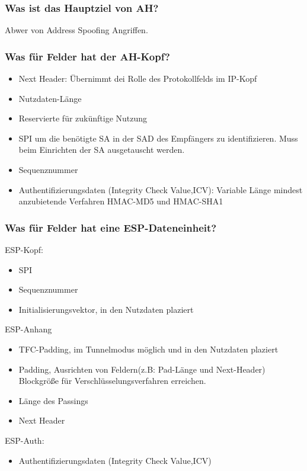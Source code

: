 	\subsubsection{Was ist das Hauptziel von AH?}
	Abwer von Address Spoofing Angriffen.
	
	\subsubsection{Was für Felder hat der AH-Kopf?}
	\begin{itemize}
		\item Next Header: Übernimmt dei Rolle des Protokollfelds im IP-Kopf
		\item Nutzdaten-Länge
		\item Reservierte für zukünftige Nutzung
		\item SPI um die benötigte SA in der SAD des Empfängers zu identifizieren. Muss beim Einrichten der SA ausgetauscht werden.
		\item Sequenznummer
		\item Authentifizierungsdaten (Integrity Check Value,ICV): Variable Länge mindest anzubietende Verfahren HMAC-MD5 und HMAC-SHA1
	\end{itemize}

	
	\subsubsection{Was für Felder hat eine ESP-Dateneinheit?}
	ESP-Kopf:	
	\begin{itemize}
		\item SPI
		\item Sequenznummer
		\item Initialisierungsvektor, in den Nutzdaten plaziert
	\end{itemize}
	ESP-Anhang
	\begin{itemize}
		\item TFC-Padding, im Tunnelmodus möglich und in den Nutzdaten plaziert
		\item Padding, Ausrichten von Feldern(z.B: Pad-Länge und Next-Header) Blockgröße für Verschlüsselungsverfahren erreichen.
		\item Länge des Passings
		\item Next Header
	\end{itemize}
	ESP-Auth:
	\begin{itemize}
		\item Authentifizierungsdaten (Integrity Check Value,ICV)
	\end{itemize}
	
